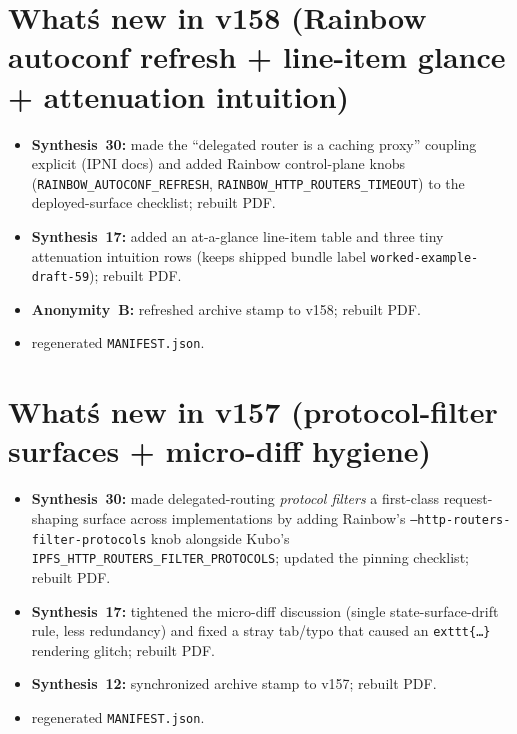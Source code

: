 \documentclass[11pt]{article}
\begin{document}
\section{What\'s new in v158 (Rainbow autoconf refresh + line-item glance + attenuation intuition)}
\begin{itemize}[leftmargin=*]
\item \textbf{Synthesis~30:} made the ``delegated router is a caching proxy'' coupling explicit (IPNI docs) and added Rainbow control-plane knobs (\texttt{RAINBOW\_AUTOCONF\_REFRESH}, \texttt{RAINBOW\_HTTP\_ROUTERS\_TIMEOUT}) to the deployed-surface checklist; rebuilt PDF.
\item \textbf{Synthesis~17:} added an at-a-glance line-item table and three tiny attenuation intuition rows (keeps shipped bundle label \texttt{worked-example-draft-59}); rebuilt PDF.
\item \textbf{Anonymity~B:} refreshed archive stamp to v158; rebuilt PDF.
\item regenerated \texttt{MANIFEST.json}.
\end{itemize}

\section{What\'s new in v157 (protocol-filter surfaces + micro-diff hygiene)}
\begin{itemize}[leftmargin=*]
\item \textbf{Synthesis~30:} made delegated-routing \emph{protocol filters} a first-class request-shaping surface across implementations by adding Rainbow's \texttt{--http-routers-filter-protocols} knob alongside Kubo's \texttt{IPFS\_HTTP\_ROUTERS\_FILTER\_PROTOCOLS}; updated the pinning checklist; rebuilt PDF.
\item \textbf{Synthesis~17:} tightened the micro-diff discussion (single state-surface-drift rule, less redundancy) and fixed a stray tab/typo that caused an \texttt{exttt\{\dots\}} rendering glitch; rebuilt PDF.
\item \textbf{Synthesis~12:} synchronized archive stamp to v157; rebuilt PDF.
\item regenerated \texttt{MANIFEST.json}.
\end{itemize}
\end{document}

